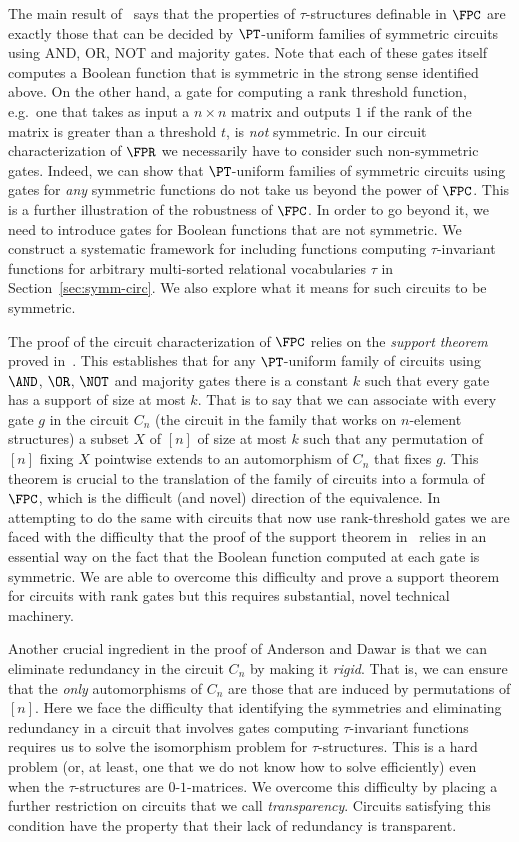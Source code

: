 \documentclass[a4paper,UKenglish]{lipics-v2018}
\begin{document}
The main result of~\cite{AndersonD17} says that the properties of
$\tau$-structures definable in $\FPC$ are exactly those that can be decided by
$\PT$-uniform families of symmetric circuits using AND, OR, NOT and majority
gates. Note that each of these gates itself computes a Boolean function that is
symmetric in the strong sense identified above. On the other hand, a gate for
computing a rank threshold function, e.g.\ one that takes as input a $n \times
n$ matrix and outputs $1$ if the rank of the matrix is greater than a threshold
$t$, is \emph{not} symmetric. In our circuit characterization of $\FPR$ we
necessarily have to consider such non-symmetric gates. Indeed, we can show that $\PT$-uniform families of symmetric circuits
using gates for \emph{any} symmetric functions do not take us beyond the power
of $\FPC$. This is a further illustration of the robustness of $\FPC$. In order
to go beyond it, we need to introduce gates for Boolean functions that are not
symmetric. We construct a systematic framework for including functions computing
$\tau$-invariant functions for arbitrary multi-sorted relational vocabularies
$\tau$ in Section~\ref{sec:symm-circ}. We also explore what it means for such
circuits to be symmetric.

The proof of the circuit characterization of $\FPC$ relies on the \emph{support
  theorem} proved in~\cite{AndersonD17}. This establishes that for any
$\PT$-uniform family of circuits using $\AND$, $\OR$, $\NOT$ and majority gates
there is a constant $k$ such that every gate has a support of size at most $k$.
That is to say that we can associate with every gate $g$ in the circuit $C_n$
(the circuit in the family that works on $n$-element structures) a subset $X$ of
$[n]$ of size at most $k$ such that any permutation of $[n]$ fixing $X$
pointwise extends to an automorphism of $C_n$ that fixes $g$. This theorem is
crucial to the translation of the family of circuits into a formula of $\FPC$,
which is the difficult (and novel) direction of the equivalence. In attempting
to do the same with circuits that now use rank-threshold gates we are faced with
the difficulty that the proof of the support theorem in~\cite{AndersonD17}
relies in an essential way on the fact that the Boolean function computed at
each gate is symmetric. We are able to overcome this difficulty and prove a
support theorem for circuits with rank gates but this requires substantial,
novel technical machinery.

Another crucial ingredient in the proof of Anderson and Dawar is that we can
eliminate redundancy in the circuit $C_n$ by making it \emph{rigid}. That is, we
can ensure that the \emph{only} automorphisms of $C_n$ are those that are
induced by permutations of $[n]$.  Here we face the difficulty that identifying
the symmetries and eliminating redundancy in a circuit that involves gates
computing $\tau$-invariant functions requires us to solve the isomorphism
problem for $\tau$-structures. This is a hard problem (or, at least, one that we
do not know how to solve efficiently) even when the $\tau$-structures are
$0$-$1$-matrices. We overcome this difficulty by placing a further restriction
on circuits that we call \emph{transparency}. Circuits satisfying this condition
have the property that their lack of redundancy is transparent. 
\end{document}
